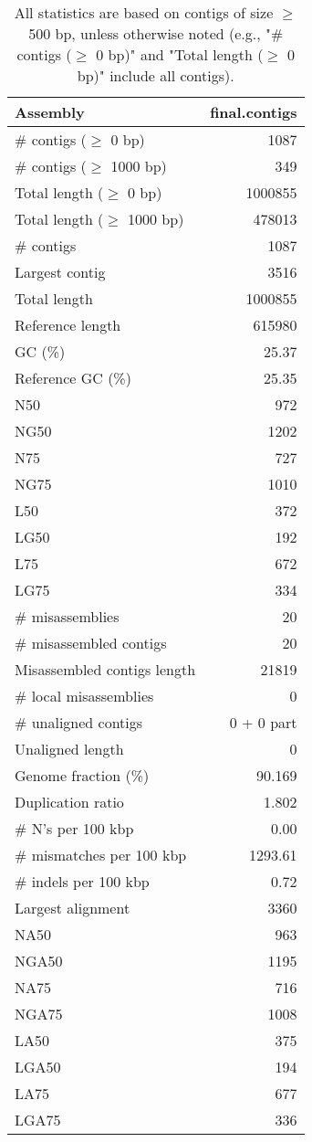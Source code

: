 \documentclass[12pt,a4paper]{article}
\begin{document}
\begin{table}[ht]
\begin{center}
\caption{All statistics are based on contigs of size $\geq$ 500 bp, unless otherwise noted (e.g., "\# contigs ($\geq$ 0 bp)" and "Total length ($\geq$ 0 bp)" include all contigs).}
\begin{tabular}{|l*{1}{|r}|}
\hline
Assembly & final.contigs \\ \hline
\# contigs ($\geq$ 0 bp) & 1087 \\ \hline
\# contigs ($\geq$ 1000 bp) & 349 \\ \hline
Total length ($\geq$ 0 bp) & 1000855 \\ \hline
Total length ($\geq$ 1000 bp) & 478013 \\ \hline
\# contigs & 1087 \\ \hline
Largest contig & 3516 \\ \hline
Total length & 1000855 \\ \hline
Reference length & 615980 \\ \hline
GC (\%) & 25.37 \\ \hline
Reference GC (\%) & 25.35 \\ \hline
N50 & 972 \\ \hline
NG50 & 1202 \\ \hline
N75 & 727 \\ \hline
NG75 & 1010 \\ \hline
L50 & 372 \\ \hline
LG50 & 192 \\ \hline
L75 & 672 \\ \hline
LG75 & 334 \\ \hline
\# misassemblies & 20 \\ \hline
\# misassembled contigs & 20 \\ \hline
Misassembled contigs length & 21819 \\ \hline
\# local misassemblies & 0 \\ \hline
\# unaligned contigs & 0 + 0 part \\ \hline
Unaligned length & 0 \\ \hline
Genome fraction (\%) & 90.169 \\ \hline
Duplication ratio & 1.802 \\ \hline
\# N's per 100 kbp & 0.00 \\ \hline
\# mismatches per 100 kbp & 1293.61 \\ \hline
\# indels per 100 kbp & 0.72 \\ \hline
Largest alignment & 3360 \\ \hline
NA50 & 963 \\ \hline
NGA50 & 1195 \\ \hline
NA75 & 716 \\ \hline
NGA75 & 1008 \\ \hline
LA50 & 375 \\ \hline
LGA50 & 194 \\ \hline
LA75 & 677 \\ \hline
LGA75 & 336 \\ \hline
\end{tabular}
\end{center}
\end{table}
\end{document}
